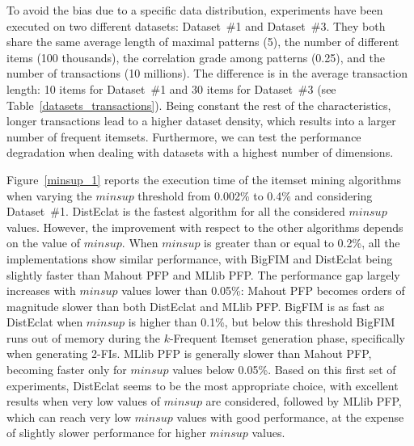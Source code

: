 To avoid the bias due to a specific data distribution,
experiments have been executed on two different datasets:
Dataset~\#1 and Dataset~\#3.
They both share the same average length of maximal patterns (5),
the number of different items (100 thousands),
the correlation grade among patterns (0.25), and
the number of transactions (10 millions).
The difference is in the average transaction length:
10 items for Dataset~\#1 and 30 items for Dataset~\#3
(see Table~\ref{datasets_transactions}).
Being constant the rest of the characteristics,
longer transactions lead to a higher dataset density,
which results into a larger number of frequent itemsets.
Furthermore, we can test the performance degradation
when dealing with datasets with a highest number of dimensions.



Figure~\ref{minsup_1} reports the execution time of the itemset mining
algorithms when varying the $minsup$ threshold from 0.002\% to 0.4\% and
considering Dataset~\#1. DistEclat is the fastest algorithm for all the
considered $minsup$ values. However, the improvement with respect to the
other algorithms depends on the value of $minsup$.
When $minsup$ is greater than or equal to 0.2\%, all the implementations show
similar performance, with BigFIM and DistEclat being slightly faster than
Mahout PFP and MLlib PFP.
The performance gap largely increases
with $minsup$ values lower than 0.05\%:
Mahout PFP becomes orders of magnitude slower than both
DistEclat and MLlib PFP.
BigFIM is as fast as DistEclat when $minsup$ is higher than 0.1\%, but below
this threshold BigFIM runs out of memory during the
$k$-Frequent Itemset generation phase, specifically when generating 2-FIs.
MLlib PFP is generally slower than Mahout PFP,
becoming faster only for $minsup$ values below 0.05\%.
Based on this first set of experiments, DistEclat seems to be the
most appropriate choice, with excellent results when very low values of $minsup$ are considered,
followed by MLlib PFP, which can reach very low $minsup$ values with
good performance, at the expense of slightly slower performance for higher $minsup$ values.


